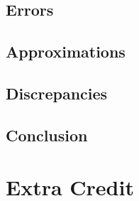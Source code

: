 \documentclass[10pt]{article}
\begin{document}
\subsection*{Errors}

\subsection*{Approximations}

\subsection*{Discrepancies}

\subsection*{Conclusion} 

\section{Extra Credit}

\end{document}

